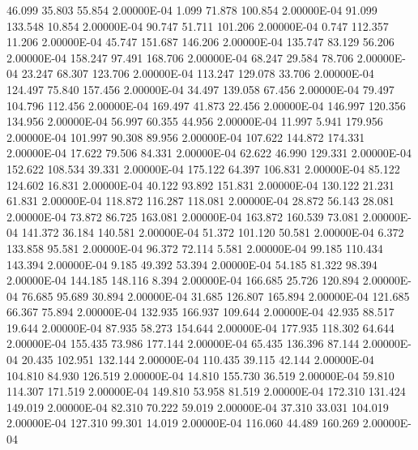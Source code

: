     46.099    35.803    55.854  2.00000E-04
     1.099    71.878   100.854  2.00000E-04
    91.099   133.548    10.854  2.00000E-04
    90.747    51.711   101.206  2.00000E-04
     0.747   112.357    11.206  2.00000E-04
    45.747   151.687   146.206  2.00000E-04
   135.747    83.129    56.206  2.00000E-04
   158.247    97.491   168.706  2.00000E-04
    68.247    29.584    78.706  2.00000E-04
    23.247    68.307   123.706  2.00000E-04
   113.247   129.078    33.706  2.00000E-04
   124.497    75.840   157.456  2.00000E-04
    34.497   139.058    67.456  2.00000E-04
    79.497   104.796   112.456  2.00000E-04
   169.497    41.873    22.456  2.00000E-04
   146.997   120.356   134.956  2.00000E-04
    56.997    60.355    44.956  2.00000E-04
    11.997     5.941   179.956  2.00000E-04
   101.997    90.308    89.956  2.00000E-04
   107.622   144.872   174.331  2.00000E-04
    17.622    79.506    84.331  2.00000E-04
    62.622    46.990   129.331  2.00000E-04
   152.622   108.534    39.331  2.00000E-04
   175.122    64.397   106.831  2.00000E-04
    85.122   124.602    16.831  2.00000E-04
    40.122    93.892   151.831  2.00000E-04
   130.122    21.231    61.831  2.00000E-04
   118.872   116.287   118.081  2.00000E-04
    28.872    56.143    28.081  2.00000E-04
    73.872    86.725   163.081  2.00000E-04
   163.872   160.539    73.081  2.00000E-04
   141.372    36.184   140.581  2.00000E-04
    51.372   101.120    50.581  2.00000E-04
     6.372   133.858    95.581  2.00000E-04
    96.372    72.114     5.581  2.00000E-04
    99.185   110.434   143.394  2.00000E-04
     9.185    49.392    53.394  2.00000E-04
    54.185    81.322    98.394  2.00000E-04
   144.185   148.116     8.394  2.00000E-04
   166.685    25.726   120.894  2.00000E-04
    76.685    95.689    30.894  2.00000E-04
    31.685   126.807   165.894  2.00000E-04
   121.685    66.367    75.894  2.00000E-04
   132.935   166.937   109.644  2.00000E-04
    42.935    88.517    19.644  2.00000E-04
    87.935    58.273   154.644  2.00000E-04
   177.935   118.302    64.644  2.00000E-04
   155.435    73.986   177.144  2.00000E-04
    65.435   136.396    87.144  2.00000E-04
    20.435   102.951   132.144  2.00000E-04
   110.435    39.115    42.144  2.00000E-04
   104.810    84.930   126.519  2.00000E-04
    14.810   155.730    36.519  2.00000E-04
    59.810   114.307   171.519  2.00000E-04
   149.810    53.958    81.519  2.00000E-04
   172.310   131.424   149.019  2.00000E-04
    82.310    70.222    59.019  2.00000E-04
    37.310    33.031   104.019  2.00000E-04
   127.310    99.301    14.019  2.00000E-04
   116.060    44.489   160.269  2.00000E-04
